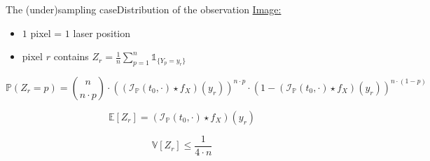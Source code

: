 \begin{frame}{The (under)sampling case}{Distribution of the observation}
\underline{Image:}
\begin{itemize}
\item $1$ pixel = $1$ laser position
\item pixel $r$ contains $Z_{r} = \frac{1}{n} \sum\limits_{p = 1}^{n} \mathds{1}_{\{Y_{p} = y_{r}\}}$
\end{itemize}
\[\mathds{P}(Z_{r} = p) = {{n}\choose{n \cdot p}} \cdot \left((\mathcal{I}_{\mathds{P}}(t_{0}, \cdot) \star f_{X})(y_{r})\right)^{n \cdot p} \cdot \left(1 - (\mathcal{I}_{\mathds{P}}(t_{0}, \cdot) \star f_{X})(y_{r})\right)^{n \cdot (1 - p)}\]

\[ \mathds{E}\left[Z_{r}\right] = (\mathcal{I}_{\mathds{P}}(t_{0}, \cdot) \star f_{X})(y_{r}) \]

\[ \mathds{V}\left[Z_{r}\right] \leq \frac{1}{4 \cdot n} \]
\end{frame}